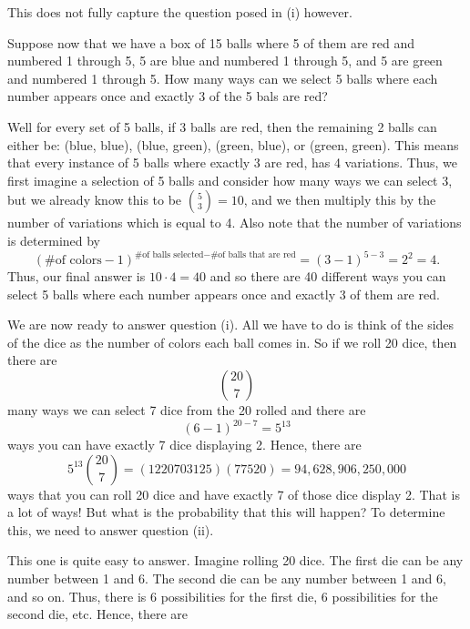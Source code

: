 \documentclass[leqno]{article}
\theoremstyle{definition}
\theoremstyle{remark}
\theoremstyle{definition}
\begin{document}
This does not fully capture the question posed in (i) however.\par Suppose now that we have a box of 15 balls where 5 of them are red and numbered 1 through 5, 5 are blue and numbered 1 through 5, and 5 are green and numbered 1 through 5. How many ways can we select 5 balls where each number appears once and exactly 3 of the 5 bals are red?\par Well for every set of 5 balls, if 3 balls are red, then the remaining 2 balls can either be: (blue, blue), (blue, green), (green, blue), or (green, green). This means that every instance of 5 balls where exactly 3 are red, has 4 variations. Thus, we first imagine a selection of 5 balls and consider how many ways we can select 3, but we already know this to be $\binom{5}{3}=10$, and we then multiply this by the number of variations which is equal to 4. Also note that the number of variations is determined by
    \begin{equation*}
        (\text{\# of colors}-1)^{\text{\# of balls selected}-\text{\# of balls that are red}}=(3-1)^{5-3}=2^2=4.
    \end{equation*}
Thus, our final answer is $10\cdot 4=40$ and so there are 40 different ways you can select 5 balls where each number appears once and exactly 3 of them are red.\par We are now ready to answer question (i). All we have to do is think of the sides of the dice as the number of colors each ball comes in. So if we roll 20 dice, then there are 
    \begin{equation*}
        \binom{20}{7}
    \end{equation*}
many ways we can select 7 dice from the 20 rolled and there are
    \begin{equation*}
        (6-1)^{20-7}=5^{13}
    \end{equation*}
ways you can have exactly 7 dice displaying 2. Hence, there are
    \begin{equation*}
        5^{13}\binom{20}{7}=(1220703125)(77520)=94,628,906,250,000
    \end{equation*}
ways that you can roll 20 dice and have exactly 7 of those dice display 2. That is a lot of ways! But what is the probability that this will happen? To determine this, we need to answer question (ii).\par This one is quite easy to answer. Imagine rolling 20 dice. The first die can be any number between 1 and 6. The second die can be any number between 1 and 6, and so on. Thus, there is 6 possibilities for the first die, 6 possibilities for the second die, etc. Hence, there are 
\end{document}
